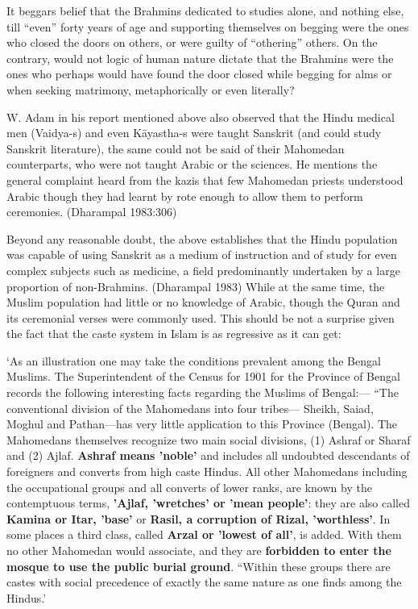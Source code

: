 It beggars belief that the Brahmins dedicated to studies alone, and nothing else, till “even” forty years of age and supporting themselves on begging were the ones who closed the doors on others, or were guilty of “othering” others. On the contrary, would not logic of human nature dictate that the Brahmins were the ones who perhaps would have found the door closed while begging for alms or when seeking matrimony, metaphorically or even literally?

W. Adam in his report mentioned above also observed that the Hindu medical men (Vaidya-s) and even Kāyastha-s were taught Sanskrit (and could study Sanskrit literature), the same could not be said of their Mahomedan counterparts, who were not taught Arabic or the sciences. He mentions the general complaint heard from the kazis that few Mahomedan priests understood Arabic though they had learnt by rote enough to allow them to perform ceremonies. (Dharampal 1983:306)

Beyond any reasonable doubt, the above establishes that the Hindu population was capable of using Sanskrit as a medium of instruction and of study for even complex subjects such as medicine, a field predominantly undertaken by a large proportion of non-Brahmins. (Dharampal 1983) While at the same time, the Muslim population had little or no knowledge of Arabic, though the Quran and its ceremonial verses were commonly used. This should be not a surprise given the fact that the caste system in Islam is as regressive as it can get:

\begin{myquote}
‘As an illustration one may take the conditions prevalent among the Bengal Muslims. The Superintendent of the Census for 1901 for the Province of Bengal records the following interesting facts regarding the Muslims of Bengal:— “The conventional division of the Mahomedans into four tribes— Sheikh, Saiad, Moghul and Pathan—has very little application to this Province (Bengal). The Mahomedans themselves recognize two main social divisions, (1) Ashraf or Sharaf and (2) Ajlaf. \textbf{Ashraf means 'noble'} and includes all undoubted descendants of foreigners and converts from high caste Hindus. All other Mahomedans including the occupational groups and all converts of lower ranks, are known by the contemptuous terms, \textbf{'Ajlaf, 'wretches' or 'mean people'}: they are also called \textbf{Kamina or Itar, 'base'} or \textbf{Rasil, a corruption of Rizal, 'worthless'}. In some places a third class, called \textbf{Arzal or 'lowest of all'}, is added. With them no other Mahomedan would associate, and they are \textbf{forbidden to enter the mosque to use the public burial ground}. “Within these groups there are castes with social precedence of exactly the same nature as one finds among the Hindus.'
\end{myquote}

